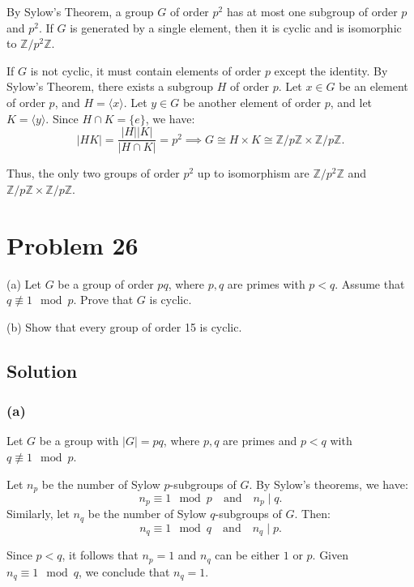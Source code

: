 \documentclass[12pt]{article}
\begin{document}
By Sylow’s Theorem, a group \( G \) of order \( p^2 \) has at most one subgroup of order \( p \) and \( p^2 \). If \( G \) is generated by a single element, then it is cyclic and is isomorphic to \( \mathbb{Z} / p^2\mathbb{Z} \).

If \( G \) is not cyclic, it must contain elements of order \( p \) except the identity. By Sylow's Theorem, there exists a subgroup \( H \) of order \( p \). Let \( x \in G \) be an element of order \( p \), and \( H = \langle x \rangle \). Let \( y \in G \) be another element of order \( p \), and let \( K = \langle y \rangle \). Since \( H \cap K = \{e\} \), we have:
\[
|HK| = \frac{|H||K|}{|H \cap K|} = p^2 \implies G \cong H \times K \cong \mathbb{Z} / p\mathbb{Z} \times \mathbb{Z} / p\mathbb{Z}.
\]

Thus, the only two groups of order \( p^2 \) up to isomorphism are \( \mathbb{Z} / p^2\mathbb{Z} \) and \( \mathbb{Z} / p\mathbb{Z} \times \mathbb{Z} / p\mathbb{Z} \).


\section*{Problem 26}

(a) Let \( G \) be a group of order \( pq \), where \( p, q \) are primes with \( p < q \). Assume that \( q \not\equiv 1 \mod p \). Prove that \( G \) is cyclic.

(b) Show that every group of order 15 is cyclic.

\subsection*{Solution}
\subsubsection*{(a)}
Let \( G \) be a group with \( |G| = pq \), where \( p, q \) are primes and \( p < q \) with \( q \not\equiv 1 \mod p \).

Let \( n_p \) be the number of Sylow \( p \)-subgroups of \( G \). By Sylow’s theorems, we have:
\[
n_p \equiv 1 \mod p \quad \text{and} \quad n_p \mid q.
\]
Similarly, let \( n_q \) be the number of Sylow \( q \)-subgroups of \( G \). Then:
\[
n_q \equiv 1 \mod q \quad \text{and} \quad n_q \mid p.
\]

Since \( p < q \), it follows that \( n_p = 1 \) and \( n_q \) can be either \( 1 \) or \( p \). Given \( n_q \equiv 1 \mod q \), we conclude that \( n_q = 1 \).
\end{document}
